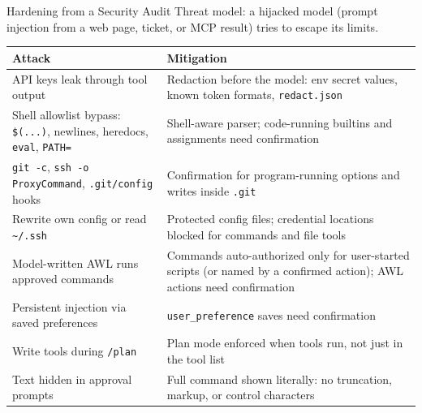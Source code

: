 \documentclass[aspectratio=169,10pt]{beamer}
\begin{document}
\begin{frame}{Hardening from a Security Audit}
\scriptsize
Threat model: a \alert{hijacked model} (prompt injection from a web page, ticket, or MCP result) tries to escape its limits.

\medskip
\begin{tabular}{@{}p{}p{}@{}}
\toprule
\textbf{Attack} & \textbf{Mitigation} \\
\midrule
API keys leak through tool output &
  Redaction before the model: env secret values, known token formats, \texttt{redact.json} \\
Shell allowlist bypass: \texttt{\$(...)}, newlines, heredocs, \texttt{eval}, \texttt{PATH=} &
  Shell-aware parser; code-running builtins and assignments need confirmation \\
\texttt{git -c}, \texttt{ssh -o ProxyCommand}, \texttt{.git/config} hooks &
  Confirmation for program-running options and writes inside \texttt{.git} \\
Rewrite own config or read \texttt{\textasciitilde/.ssh} &
  Protected config files; credential locations blocked for commands and file tools \\
Model-written AWL runs approved commands &
  Commands auto-authorized only for user-started scripts (or named by a confirmed action); AWL actions need confirmation \\
Persistent injection via saved preferences &
  \texttt{user\_preference} saves need confirmation \\
Write tools during \texttt{/plan} &
  Plan mode enforced when tools run, not just in the tool list \\
Text hidden in approval prompts &
  Full command shown literally: no truncation, markup, or control characters \\
\bottomrule
\end{tabular}
\end{frame}
\end{document}
